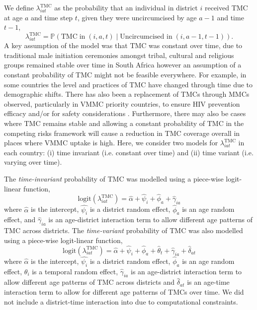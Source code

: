 \documentclass{article}
\begin{document}
\begin{appendix}
\noindent We define $\lambda^{\text{TMC}}_{iat}$ as the probability that an individual in district $i$ received TMC at age $a$ and time step $t$, given they were uncircumcised by age $a-1$ and time $t-1$, 
\begin{equation} 
		\lambda^{\text{TMC}}_{iat} = \mathbb{P}(\text{TMC} \; \text{in} \; (i,a,t) \; | \; \text{Uncircumcised in} \; (i,a-1, t-1)). 
	\label{eqn::TMC}
\end{equation}
A key assumption of the \cite{thomas2021multilevel} model was that TMC was constant over time, due to traditional male initiation ceremonies amongst tribal, cultural and religious groups remained stable over time in South Africa however an assumption of a constant probability of TMC might not be feasible everywhere. For example, in some countries the level and practices of TMC have changed through time due to demographic shifts. There has also been a replacement of TMCs through MMCs observed, particularly in VMMC priority countries, to ensure HIV prevention efficacy and/or for safety considerations \cite{thomas2021multilevel}. Furthermore, there may also be cases where TMC remains stable and allowing a constant probability of TMC in the competing risks framework will cause a reduction in TMC coverage overall in places where VMMC uptake is high. Here, we consider two models for $\lambda^{\text{TMC}}_{iat}$ in each country: (i) time invariant (i.e. constant over time) and (ii) time variant (i.e. varying over time). 

The {\it time-invariant} probability of TMC was modelled using a piece-wise logit-linear function, 
\begin{equation*} 
	\text{logit}(\lambda^{\text{TMC}}_{iat}) = \hat{\alpha} + \hat{\psi}_i + \hat{\phi}_a + \hat{\gamma}_{ia}
\end{equation*}
where $\hat{\alpha}$ is the intercept, $\hat{\psi_i}$ is a district random effect, $\hat{\phi}_a$ is an age random effect, and $\hat{\gamma}_{ia}$ is an age-district interaction term to allow different age patterns of TMC across districts. The {\it time-variant} probability of TMC was also modelled using a piece-wise logit-linear function, 
\begin{equation*} 
	\text{logit}(\lambda^{\text{TMC}}_{iat}) = \hat{\alpha} + \hat{\psi}_i + \hat{\phi}_a + \hat{\theta}_t + \hat{\gamma}_{ia} + \hat{\delta}_{at}
\end{equation*}
where $\hat{\alpha}$ is the intercept, $\hat{\psi_i}$ is a district random effect, $\hat{\phi}_a$ is an age random effect, $\theta_i$ is a temporal random effect,  $\hat{\gamma}_{ia}$ is an age-district interaction term to allow different age patterns of TMC across districts and $\hat{\delta}_{at}$ is an age-time interaction term to allow for different age patterns of TMCs over time. We did not include a district-time interaction into due to computational constraints. 


\end{appendix}
\end{document}
